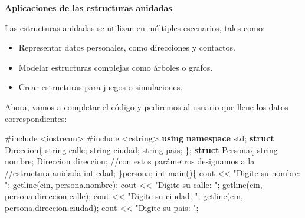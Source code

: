 \documentclass[
  11pt,
  a4paper,
  DIV=11,
  numbers=noendperiod]{scrreprt}
\newenvironment{Shaded}{\begin{snugshade}}{\end{snugshade}}
\newcommand{\CommentTok}[1]{\textcolor[rgb]{0.37,0.37,0.37}{#1}}
\newcommand{\DataTypeTok}[1]{\textcolor[rgb]{0.68,0.00,0.00}{#1}}
\newcommand{\ImportTok}[1]{\textcolor[rgb]{0.00,0.46,0.62}{#1}}
\newcommand{\KeywordTok}[1]{\textcolor[rgb]{0.00,0.23,0.31}{\textbf{#1}}}
\newcommand{\NormalTok}[1]{\textcolor[rgb]{0.00,0.23,0.31}{#1}}
\newcommand{\OperatorTok}[1]{\textcolor[rgb]{0.37,0.37,0.37}{#1}}
\newcommand{\PreprocessorTok}[1]{\textcolor[rgb]{0.68,0.00,0.00}{#1}}
\newcommand{\StringTok}[1]{\textcolor[rgb]{0.13,0.47,0.30}{#1}}
\providecommand{\tightlist}{%
  \setlength{\itemsep}{0pt}\setlength{\parskip}{0pt}}
\begin{document}
\textbf{Aplicaciones de las estructuras anidadas}

Las estructuras anidadas se utilizan en múltiples escenarios, tales
como:

\begin{itemize}
\tightlist
\item
  Representar datos personales, como direcciones y contactos.
\item
  Modelar estructuras complejas como árboles o grafos.
\item
  Crear estructuras para juegos o simulaciones.
\end{itemize}

Ahora, vamos a completar el código y pediremos al usuario que llene los
datos correspondientes:

\begin{Shaded}
\begin{Highlighting}[]
\PreprocessorTok{\#include }\ImportTok{\textless{}iostream\textgreater{}}
\PreprocessorTok{\#include }\ImportTok{\textless{}cstring\textgreater{}}
\KeywordTok{using} \KeywordTok{namespace}\NormalTok{ std}\OperatorTok{;}
\KeywordTok{struct}\NormalTok{ Direccion}\OperatorTok{\{}
\NormalTok{    string calle}\OperatorTok{;}
\NormalTok{    string ciudad}\OperatorTok{;}
\NormalTok{    string pais}\OperatorTok{;}
\OperatorTok{\};}
\KeywordTok{struct}\NormalTok{ Persona}\OperatorTok{\{}
\NormalTok{    string nombre}\OperatorTok{;}
\NormalTok{    Direccion direccion}\OperatorTok{;} \CommentTok{//con estos parámetros designamos a la}
                          \CommentTok{//estructura anidada}
    \DataTypeTok{int}\NormalTok{ edad}\OperatorTok{;}
\OperatorTok{\}}\NormalTok{persona}\OperatorTok{;}
\DataTypeTok{int}\NormalTok{ main}\OperatorTok{()\{}
\NormalTok{    cout }\OperatorTok{\textless{}\textless{}} \StringTok{"Digite su nombre: "}\OperatorTok{;}
\NormalTok{    getline}\OperatorTok{(}\NormalTok{cin}\OperatorTok{,}\NormalTok{ persona}\OperatorTok{.}\NormalTok{nombre}\OperatorTok{);}
\NormalTok{    cout }\OperatorTok{\textless{}\textless{}} \StringTok{"Digite su calle: "}\OperatorTok{;}
\NormalTok{    getline}\OperatorTok{(}\NormalTok{cin}\OperatorTok{,}\NormalTok{ persona}\OperatorTok{.}\NormalTok{direccion}\OperatorTok{.}\NormalTok{calle}\OperatorTok{);}
\NormalTok{    cout }\OperatorTok{\textless{}\textless{}} \StringTok{"Digite su ciudad: "}\OperatorTok{;}
\NormalTok{    getline}\OperatorTok{(}\NormalTok{cin}\OperatorTok{,}\NormalTok{ persona}\OperatorTok{.}\NormalTok{direccion}\OperatorTok{.}\NormalTok{ciudad}\OperatorTok{);}
\NormalTok{    cout }\OperatorTok{\textless{}\textless{}} \StringTok{"Digite su pais: "}\OperatorTok{;}

\end{Highlighting}
\end{Shaded}
\end{document}
